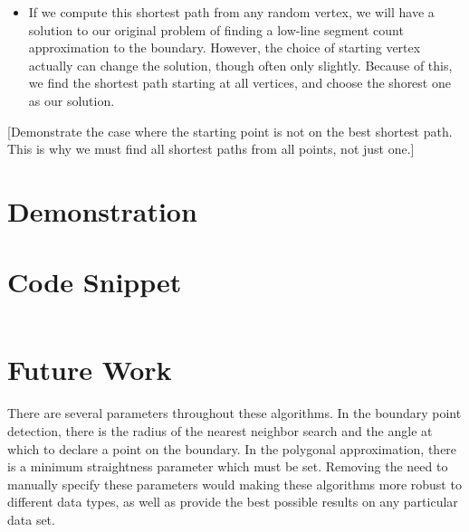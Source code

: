 \documentclass{InsightArticle}
\begin{document}
\begin{itemize}
 \item If we compute this shortest path from any random vertex, we will have a solution to our original problem of finding a low-line segment count approximation to the boundary. However, the choice of starting vertex actually can change the solution, though often only slightly. Because of this, we find the shortest path starting at all vertices, and choose the shorest one as our solution.
\end{itemize}

[Demonstrate the case where the starting point is not on the best shortest path. This is why we must find all shortest paths from all points, not just one.]

\section{Demonstration}
\label{sec:Demonstration}


\section{Code Snippet}

\begin{verbatim}

\end{verbatim}

\section{Future Work}
There are several parameters throughout these algorithms. In the boundary point detection, there is the radius of the nearest neighbor search and the angle at which to declare a point on the boundary. In the polygonal approximation, there is a minimum straightness parameter which must be set. Removing the need to manually specify these parameters would making these algorithms more robust to different data types, as well as provide the best possible results on any particular data set.
\end{document}
